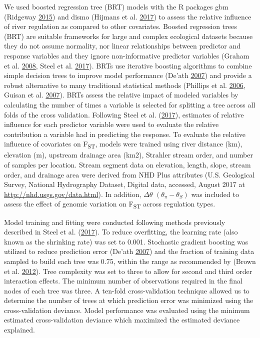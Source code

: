 \documentclass[proquest,12pt,final]{ucthesis-CA2012} %
\begin{document}
\begin{ucmainmatter}
We used boosted regression tree (BRT) models with the R packages gbm
(Ridgeway \protect\hyperlink{ref-ridgeway_gbm_2015}{2015}) and dismo
(Hijmans et al. \protect\hyperlink{ref-hijmans_dismo_2017}{2017}) to
assess the relative influence of river regulation as compared to other
covariates. Boosted regression trees (BRT) are suitable frameworks for
large and complex ecological datasets because they do not assume
normality, nor linear relationships between predictor and response
variables and they ignore non-informative predictor variables (Graham et
al. \protect\hyperlink{ref-graham_influence_2008}{2008}, Steel et al.
\protect\hyperlink{ref-steel_associating_2017}{2017}). BRTs use
iterative boosting algorithms to combine simple decision trees to
improve model performance (De'ath
\protect\hyperlink{ref-death_boosted_2007}{2007}) and provide a robust
alternative to many traditional statistical methods (Phillips et al.
\protect\hyperlink{ref-phillips_maximum_2006}{2006}, Guisan et al.
\protect\hyperlink{ref-guisan_what_2007}{2007}). BRTs assess the
relative impact of modeled variables by calculating the number of times
a variable is selected for splitting a tree across all folds of the
cross validation. Following Steel et al.
(\protect\hyperlink{ref-steel_associating_2017}{2017}), estimates of
relative influence for each predictor variable were used to evaluate the
relative contribution a variable had in predicting the response. To
evaluate the relative influence of covariates on F\textsubscript{ST},
models were trained using river distance (km), elevation (m), upstream
drainage area (km2), Strahler stream order, and number of samples per
location. Stream segment data on elevation, length, slope, stream order,
and drainage area were derived from NHD Plus attributes (U.S. Geological
Survey, National Hydrography Dataset, Digital data, accessed, August
2017 at \url{http://nhd.usgs.gov/data.html}). In addition,
\(\Delta \theta\) \((\theta_\pi - \theta_S)\) was included to assess the
effect of genomic variation on F\textsubscript{ST} across regulation
types.

Model training and fitting were conducted following methods previously
described in Steel et al.
(\protect\hyperlink{ref-steel_associating_2017}{2017}). To reduce
overfitting, the learning rate (also known as the shrinking rate) was
set to 0.001. Stochastic gradient boosting was utilized to reduce
prediction error (De'ath
\protect\hyperlink{ref-death_boosted_2007}{2007}) and the fraction of
training data sampled to build each tree was 0.75, within the range as
recommended by (Brown et al.
\protect\hyperlink{ref-brown_predicting_2012}{2012}). Tree complexity
was set to three to allow for second and third order interaction
effects. The minimum number of observations required in the final nodes
of each tree was three. A ten-fold cross-validation technique allowed us
to determine the number of trees at which prediction error was minimized
using the cross-validation deviance. Model performance was evaluated
using the minimum estimated cross-validation deviance which maximized
the estimated deviance explained.


\end{ucmainmatter}
\end{document}
